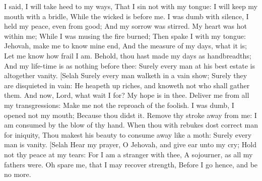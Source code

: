 I said, I will take heed to my ways, That I sin not with my tongue: I will keep my mouth with a bridle, While the wicked is before me.  I was dumb with silence, I held my peace, even from good; And my sorrow was stirred.  My heart was hot within me; While I was musing the fire burned; Then spake I with my tongue:  Jehovah, make me to know mine end, And the measure of my days, what it is; Let me know how frail I am.  Behold, thou hast made my days as handbreadths; And my life-time is as nothing before thee: Surely every man at his best estate is altogether vanity. [Selah  Surely every man walketh in a vain show; Surely they are disquieted in vain: He heapeth up riches, and knoweth not who shall gather them.  And now, Lord, what wait I for? My hope is in thee.  Deliver me from all my transgressions: Make me not the reproach of the foolish.  I was dumb, I opened not my mouth; Because thou didst it.  Remove thy stroke away from me: I am consumed by the blow of thy hand.  When thou with rebukes dost correct man for iniquity, Thou makest his beauty to consume away like a moth: Surely every man is vanity. [Selah  Hear my prayer, O Jehovah, and give ear unto my cry; Hold not thy peace at my tears: For I am a stranger with thee, A sojourner, as all my fathers were.  Oh spare me, that I may recover strength, Before I go hence, and be no more. 

